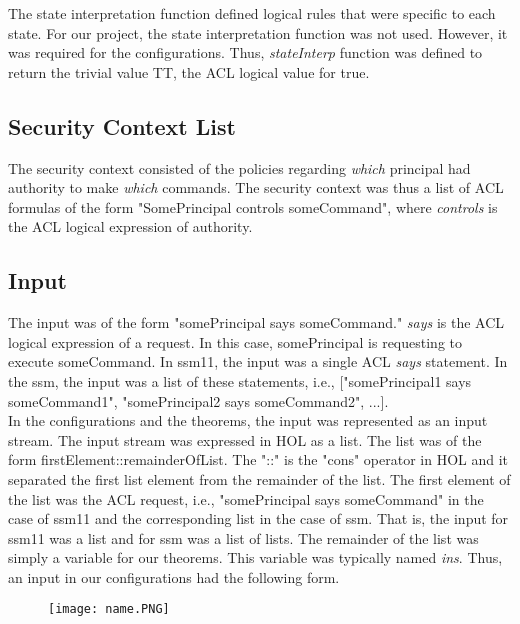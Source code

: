 The state interpretation function defined logical rules that were specific to each state.  For our project, the state interpretation function was not used.  However, it was required for the configurations.  Thus, \emph{stateInterp} function was defined to return the trivial value TT, the ACL logical value for true.  
  
\subsection{Security Context List}
\label{sec:secur-cont-list}

The security context consisted of the policies regarding \emph{which} principal had authority to make \emph{which} commands. The security context was thus a list of ACL formulas of the form "SomePrincipal controls someCommand", where \emph{controls} is the ACL logical expression of authority.
  
\subsection{Input}
\label{sec:input}
The input was of the form "somePrincipal says someCommand."  \emph{says} is the ACL logical expression of a request.   In this case, somePrincipal is requesting to execute someCommand.  In ssm11, the input was a single ACL \emph{says} statement.  In the ssm, the input was a list of these statements, i.e.,  ["somePrincipal1 says someCommand1", "somePrincipal2 says someCommand2", ...].\\
    
In the configurations and the theorems, the input was represented as an input stream.  The input stream was expressed in HOL as a list.  The list was of the form firstElement::remainderOfList.  The "::" is the "cons" operator in HOL and it separated the first list element from the remainder of the list.  The first element of the list was the ACL request, i.e., "somePrincipal says someCommand" in the case of ssm11 and the corresponding list in the case of ssm.   That is, the input for ssm11 was a list and for ssm was a list of lists.  The remainder of the list was simply a variable for our theorems.  This variable was typically named \emph{ins}.  Thus, an input in our configurations had the following form.\\
    
    \begin{figure}[h]
  \centering
  \texttt{[image: name.PNG]}
\end{figure}

